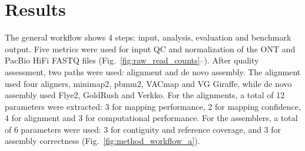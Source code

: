 \documentclass[12pt, letterpaper]{article}
\begin{document}
\section{Results}

The general workflow shows 4 steps: input, analysis, evaluation and benchmark output. Five metrics were used for input QC and normalization of the ONT and PacBio HiFi FASTQ files (Fig.~\ref{fig:raw_read_counts}--). After quality assessment, two paths were used: alignment and de novo assembly. The alignment used four aligners, minimap2, pbmm2, VACmap and VG Giraffe, while de novo assembly used Flye2, GoldRush and Verkko. For the alignments, a total of 12 parameters were extracted: 3 for mapping performance, 2 for mapping confidence, 4 for alignment and 3 for computational performance. For the assemblers, a total of 6 parameters were used: 3 for contiguity and reference coverage, and 3 for assembly correctness (Fig.~\ref{fig:method_workflow_a}).
\end{document}
